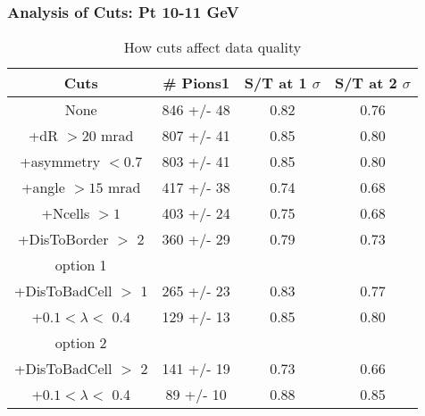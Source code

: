 \frame
{
\frametitle{Analysis of Cuts: Pt 10-11 GeV}
\begin{table}
\caption{How cuts affect data quality}
\centering
\begin{tabular}{c c c c}
\hline\hline
Cuts & \# Pions1 & S/T at 1 $\sigma$ & S/T at 2 $\sigma$ \\ [0.5ex]
\hline
None &  846 +/-   48 & 0.82 & 0.76 \\ %
+dR $> 20$ mrad &  807 +/-   41 & 0.85 & 0.80 \\ %
+asymmetry $< 0.7$ &  803 +/-   41 & 0.85 & 0.80 \\ %
+angle $> 15$ mrad &  417 +/-   38 & 0.74 & 0.68 \\ %
+Ncells $> 1$&  403 +/-   24 & 0.75 & 0.68 \\ %
+DisToBorder $>$ 2 &  360 +/-   29 & 0.79 & 0.73 \\ %
option 1\\
+DisToBadCell $>$ 1&  265 +/-   23 & 0.83 & 0.77 \\ %
+$0.1 < \lambda <$ 0.4 &  129 +/-   13 & 0.85 & 0.80 \\ %
option 2\\
+DisToBadCell $>$ 2&  141 +/-   19 & 0.73 & 0.66 \\ %
+$0.1 < \lambda <$ 0.4 &   89 +/-   10 & 0.88 & 0.85 \\ %
[1ex]
\hline
\end{tabular}
\label{table:nonlin}
\end{table}
}
